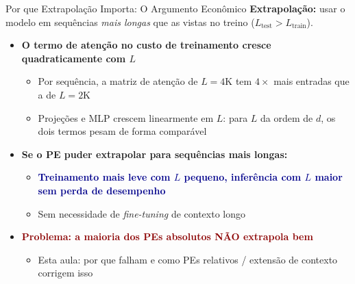 \documentclass[aspectratio=169, xcolor=dvipsnames]{beamer}
\begin{document}
  \begin{frame}{Por que Extrapolação Importa: O Argumento Econômico}
    \textbf{Extrapolação:} usar o modelo em sequências \emph{mais longas} que as vistas no treino ($L_{\text{test}} > L_{\text{train}}$).

    \vspace{0.3em}
    \begin{itemize}
      \item \textbf{O termo de atenção no custo de treinamento cresce quadraticamente com $L$}
        \begin{itemize}
          \item Por sequência, a matriz de atenção de $L = \text{4K}$ tem $4\times$ mais entradas que a de $L = \text{2K}$
          \item Projeções e MLP crescem linearmente em $L$: para $L$ da ordem de $d$, os dois termos pesam de forma comparável
        \end{itemize}
      \item \textbf{Se o PE puder extrapolar para sequências mais longas:}
        \begin{itemize}
          \item \textcolor{DarkBlue}{\textbf{Treinamento mais leve com $L$ pequeno, inferência com $L$ maior sem perda de desempenho}}
          \item Sem necessidade de \textit{fine-tuning} de contexto longo
        \end{itemize}
      \item \textcolor{DarkRed}{\textbf{Problema: a maioria dos PEs absolutos NÃO extrapola bem}}
        \begin{itemize}
          \item Esta aula: por que falham e como PEs relativos / extensão de contexto corrigem isso
        \end{itemize}
    \end{itemize}
  \end{frame}
\end{document}
